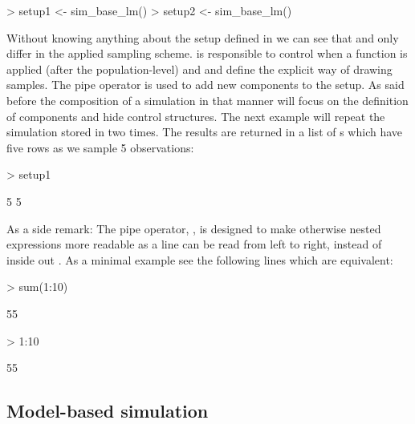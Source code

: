 \documentclass[article]{ajs}
\begin{document}
\begin{Schunk}
\begin{Sinput}
> setup1 <- sim_base_lm() %
> setup2 <- sim_base_lm() %
\end{Sinput}
\end{Schunk}

Without knowing anything about the setup defined in  we can see that  and  only differ in the applied sampling scheme.  is responsible to control when a function is applied (after the population-level) and  and  define the explicit way of drawing samples. The pipe operator \proglang{\%>\%} is used to add new components to the setup. As said before the composition of a simulation in that manner will focus on the definition of components and hide control structures. The next example will repeat the simulation stored in  two times. The results are returned in a list of s which have five rows as we sample 5 observations:

\begin{Schunk}
\begin{Sinput}
> setup1 %
\end{Sinput}
\begin{Soutput}
[1] 5 5
\end{Soutput}
\end{Schunk}

As a side remark: The pipe operator, \proglang{\%>\%}, is designed to make otherwise nested expressions more readable as a line can be read from left to right, instead of inside out \citep{bache14}. As a minimal example see the following lines which are equivalent:

\begin{Schunk}
\begin{Sinput}
> sum(1:10)
\end{Sinput}
\begin{Soutput}
[1] 55
\end{Soutput}
\begin{Sinput}
> 1:10 %
\end{Sinput}
\begin{Soutput}
[1] 55
\end{Soutput}
\end{Schunk}


\label{sec:caseStudy}
\subsection{Model-based simulation}
\end{document}
